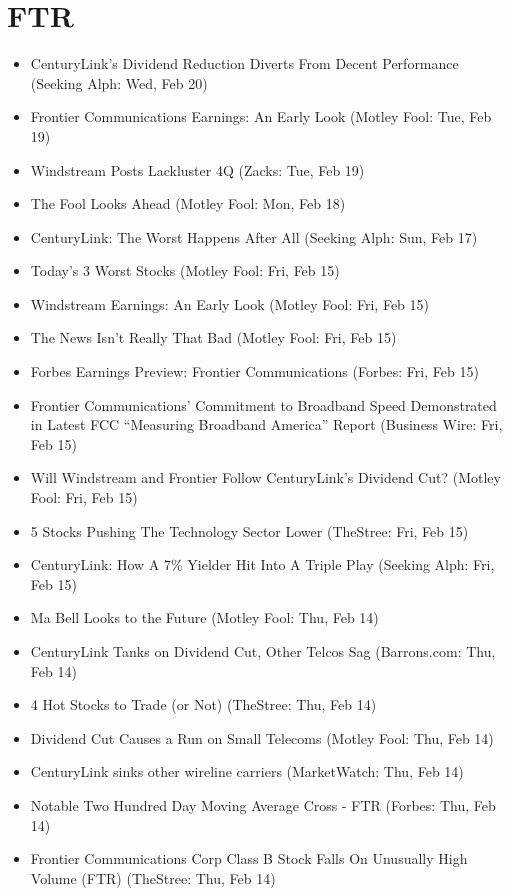 \documentclass[11pt,asymmetric]{article}
\begin{document}
\section*{FTR}
\begin{itemize}
\item CenturyLink's Dividend Reduction Diverts From Decent Performance (Seeking Alph: Wed, Feb 20)
\item Frontier Communications Earnings: An Early Look (Motley Fool: Tue, Feb 19)
\item Windstream Posts Lackluster 4Q (Zacks: Tue, Feb 19)
\item The Fool Looks Ahead (Motley Fool: Mon, Feb 18)
\item CenturyLink: The Worst Happens After All (Seeking Alph: Sun, Feb 17)
\item Today's 3 Worst Stocks (Motley Fool: Fri, Feb 15)
\item Windstream Earnings: An Early Look (Motley Fool: Fri, Feb 15)
\item The News Isn't Really That Bad (Motley Fool: Fri, Feb 15)
\item Forbes Earnings Preview: Frontier Communications (Forbes: Fri, Feb 15)
\item Frontier Communications’ Commitment to Broadband Speed Demonstrated in Latest FCC “Measuring Broadband America” Report (Business Wire: Fri, Feb 15)
\item Will Windstream and Frontier Follow CenturyLink's Dividend Cut? (Motley Fool: Fri, Feb 15)
\item 5 Stocks Pushing The Technology Sector Lower (TheStree: Fri, Feb 15)
\item CenturyLink: How A 7\% Yielder Hit Into A Triple Play (Seeking Alph: Fri, Feb 15)
\item Ma Bell Looks to the Future (Motley Fool: Thu, Feb 14)
\item CenturyLink Tanks on Dividend Cut, Other Telcos Sag (Barrons.com: Thu, Feb 14)
\item 4 Hot Stocks to Trade (or Not) (TheStree: Thu, Feb 14)
\item Dividend Cut Causes a Run on Small Telecoms (Motley Fool: Thu, Feb 14)
\item CenturyLink sinks other wireline carriers (MarketWatch: Thu, Feb 14)
\item Notable Two Hundred Day Moving Average Cross - FTR (Forbes: Thu, Feb 14)
\item Frontier Communications Corp Class B Stock Falls On Unusually High Volume (FTR) (TheStree: Thu, Feb 14)

\end{itemize}
\end{document}
